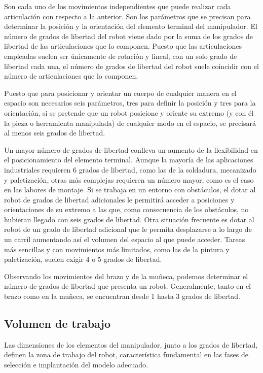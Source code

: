 \documentclass[12pt,a4paper]{report}
\begin{document}
Son cada uno de los movimientos independientes que
puede realizar cada articulación con respecto a la anterior. Son los
parámetros que se precisan para determinar la posición y la orientación del
elemento terminal del manipulador. El número de grados de libertad del robot
viene dado por la suma de los grados de libertad de las articulaciones que lo componen.
Puesto que las articulaciones empleadas suelen ser únicamente de rotación y
lineal, con un solo grado de libertad cada una, el número de grados de libertad del
robot suele coincidir con el número de articulaciones que lo componen. 

Puesto que para posicionar y orientar un cuerpo de cualquier manera en el
espacio son necesarios seis parámetros, tres para definir la posición y tres
para la orientación, si se pretende que un robot posicione y oriente su
extremo (y con él la pieza o herramienta manipulada) de cualquier modo en el
espacio, se precisará al menos seis grados de libertad.

Un mayor número de grados de libertad conlleva un aumento de la flexibilidad
en el posicionamiento del elemento terminal. Aunque la mayoría de las
aplicaciones industriales requieren 6 grados de libertad, como las de la soldadura,
mecanizado y paletización, otras más complejas requieren un número mayor,
como es el caso en las labores de montaje. Si se trabaja en un entorno con
obstáculos, el dotar al robot de grados de libertad adicionales le permitirá
acceder a posiciones y orientaciones de su extremo a las que, como
consecuencia de los obstáculos, no hubieran llegado con seis grados de
libertad. Otra situación frecuente es dotar al robot de un grado de libertad
adicional que le permita desplazarse a lo largo de un carril aumentando así
el volumen del espacio al que puede acceder. Tareas más sencillas y con
movimientos más limitados, como las de la pintura y paletización, suelen
exigir 4 o 5 grados de libertad.

Observando los movimientos del brazo y de la muñeca, podemos determinar el
número de grados de libertad que presenta un robot. Generalmente, tanto en
el brazo como en la muñeca, se encuentran desde 1 hasta 3 grados de libertad. 


\subsection{Volumen de trabajo}

Las dimensiones de los elementos del manipulador, junto a los grados de
libertad, definen la zona de trabajo del robot, característica fundamental en
las fases de selección e implantación del modelo adecuado.
\end{document}
